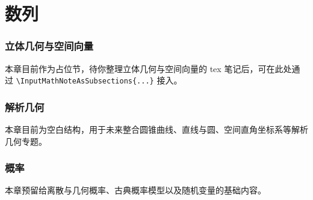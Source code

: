\documentclass[a4paper,11pt]{ctexart}
\newcommand{\InputMathNoteAsSubsections}[1]{%
  \begingroup
    \let\MathNoteOrigSection\section
    \let\MathNoteOrigSubsection\subsection
    \let\MathNoteOrigSubsubsection\subsubsection
    \renewcommand{\section}{\subsection}
    \renewcommand{\subsection}{\subsubsection}
  \endgroup
}
\begin{document}
\section{数列}
\InputMathNoteAsSubsections{高中数学-数列复习笔记.tex}

\section{立体几何与空间向量}
本章目前作为占位节，待你整理立体几何与空间向量的 tex 笔记后，可在此处通过
\verb|\InputMathNoteAsSubsections{...}| 接入。

\section{解析几何}
本章目前为空白结构，用于未来整合圆锥曲线、直线与圆、空间直角坐标系等解析几何专题。

\section{概率}
本章预留给离散与几何概率、古典概率模型以及随机变量的基础内容。
\end{document}
